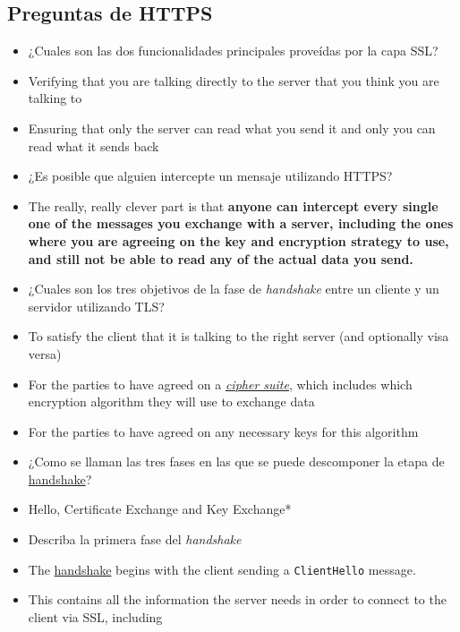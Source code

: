 \subsection{Preguntas de HTTPS}\label{preguntas-de-https}

\begin{itemize}
\itemsep1pt\parskip0pt
\item
  ¿Cuales son las dos funcionalidades principales proveídas por la capa
  SSL?
\item
  Verifying that you are talking directly to the server that you think
  you are talking to
\item
  Ensuring that only the server can read what you send it and only you
  can read what it sends back
\item
  ¿Es posible que alguien intercepte un mensaje utilizando HTTPS?
\item
  The really, really clever part is that \textbf{anyone can intercept
  every single one of the messages you exchange with a server, including
  the ones where you are agreeing on the key and encryption strategy to
  use, and still not be able to read any of the actual data you send.}
\item
  ¿Cuales son los tres objetivos de la fase de \emph{handshake} entre un
  cliente y un servidor utilizando TLS?
\item
  To satisfy the client that it is talking to the right server (and
  optionally visa versa)
\item
  For the parties to have agreed on a
  \emph{\href{https://en.wikipedia.org/wiki/Cipher_suite}{cipher
  suite}}, which includes which encryption algorithm they will use to
  exchange data
\item
  For the parties to have agreed on any necessary keys for this
  algorithm
\item
  ¿Como se llaman las tres fases en las que se puede descomponer la
  etapa de \href{http://www.dictionary.com/browse/handshake}{handshake}?
\item
  Hello, Certificate Exchange and Key Exchange*
\item
  Describa la primera fase del \emph{handshake}
\item
  The \href{http://www.dictionary.com/browse/handshake}{handshake}
  begins with the client sending a \texttt{ClientHello} message.
\item
  This contains all the information the server needs in order to connect
  to the client via SSL, including


\end{itemize}
